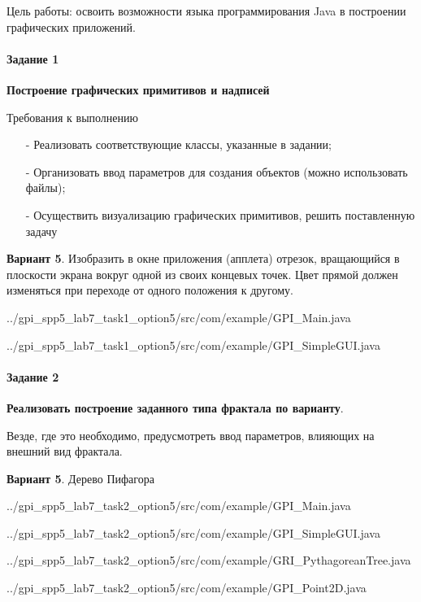 Цель работы:
освоить возможности языка программирования Java в построении графических приложений.


\paragraph{Задание 1} \hspace{0cm}

\textbf{Построение графических примитивов и надписей}

Требования к выполнению
\begin{itemize}
    \item[-] Реализовать соответствующие классы, указанные в задании;
    \item[-] Организовать ввод параметров для создания объектов (можно использовать файлы);
    \item[-] Осуществить визуализацию графических примитивов, решить поставленную задачу
\end{itemize}

\textbf{Вариант 5}.
Изобразить в окне приложения (апплета) отрезок,
вращающийся в плоскости экрана вокруг одной из своих концевых точек.
Цвет прямой должен изменяться при переходе от одного положения к другому.


{../gpi_spp5_lab7_task1_option5/src/com/example/GPI_Main.java}


{../gpi_spp5_lab7_task1_option5/src/com/example/GPI_SimpleGUI.java}


\paragraph{Задание 2} \hspace{0cm}

\textbf{Реализовать построение заданного типа фрактала по варианту}.

Везде, где это необходимо, предусмотреть ввод параметров, влияющих на внешний вид фрактала.

\textbf{Вариант 5}.
Дерево Пифагора


{../gpi_spp5_lab7_task2_option5/src/com/example/GPI_Main.java}


{../gpi_spp5_lab7_task2_option5/src/com/example/GPI_SimpleGUI.java}


{../gpi_spp5_lab7_task2_option5/src/com/example/GRI_PythagoreanTree.java}


{../gpi_spp5_lab7_task2_option5/src/com/example/GPI_Point2D.java}
